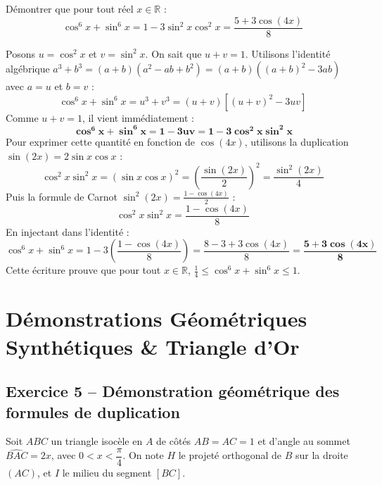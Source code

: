 \documentclass[11pt,a4paper]{article}
\newcommand{\R}{\mathbb{R}}
\begin{document}
Démontrer que pour tout réel $x \in \R$ :
\[
\cos^6 x + \sin^6 x = 1 - 3\sin^2 x \cos^2 x = \frac{5 + 3\cos(4x)}{8}
\]

\begin{correctionbox}
Posons $u = \cos^2 x$ et $v = \sin^2 x$. On sait que $u + v = 1$.
Utilisons l'identité algébrique $a^3 + b^3 = (a + b)(a^2 - ab + b^2) = (a + b)((a + b)^2 - 3ab)$ avec $a = u$ et $b = v$ :
\[
\cos^6 x + \sin^6 x = u^3 + v^3 = (u + v) \left[ (u + v)^2 - 3uv \right]
\]
Comme $u + v = 1$, il vient immédiatement :
\[
\mathbf{\cos^6 x + \sin^6 x = 1 - 3uv = 1 - 3\cos^2 x \sin^2 x}
\]
Pour exprimer cette quantité en fonction de $\cos(4x)$, utilisons la duplication $\sin(2x) = 2\sin x \cos x$ :
\[
\cos^2 x \sin^2 x = (\sin x \cos x)^2 = \left(\frac{\sin(2x)}{2}\right)^2 = \frac{\sin^2(2x)}{4}
\]
Puis la formule de Carnot $\sin^2(2x) = \frac{1 - \cos(4x)}{2}$ :
\[
\cos^2 x \sin^2 x = \frac{1 - \cos(4x)}{8}
\]
En injectant dans l'identité :
\[
\cos^6 x + \sin^6 x = 1 - 3 \left(\frac{1 - \cos(4x)}{8}\right) = \frac{8 - 3 + 3\cos(4x)}{8} = \mathbf{\frac{5 + 3\cos(4x)}{8}}
\]
Cette écriture prouve que pour tout $x \in \R$, $\frac{1}{4} \le \cos^6 x + \sin^6 x \le 1$.
\end{correctionbox}

\vspace{0.4cm}

\section{Démonstrations Géométriques Synthétiques \& Triangle d'Or}

\subsection*{Exercice 5 -- Démonstration géométrique des formules de duplication}

Soit $ABC$ un triangle isocèle en $A$ de côtés $AB = AC = 1$ et d'angle au sommet $\widehat{BAC} = 2x$, avec $0 < x < \dfrac{\pi}{4}$.
On note $H$ le projeté orthogonal de $B$ sur la droite $(AC)$, et $I$ le milieu du segment $[BC]$.
\end{document}
